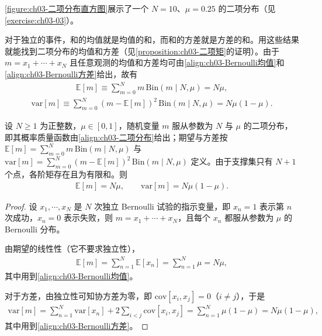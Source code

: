 \documentclass[../../main.tex]{subfiles}
\begin{document}
\cref{figure:ch03-二项分布直方图}展示了一个 $N=10$、$\mu=0.25$ 的二项分布（见\cref{exercise:ch03-03}）。

对于独立的事件，和的均值就是均值的和，而和的方差就是方差的和。用这些结果就能找到二项分布的均值和方差（见\cref{proposition:ch03-二项矩}的证明）。由于 $m=x_1+\cdots+x_N$ 且任意观测的均值和方差均可由\cref{align:ch03-Bernoulli均值}和\cref{align:ch03-Bernoulli方差}给出，故有
\begin{align}
\mathbb{E}[m]\equiv\sum_{m=0}^{N}m\,\mathrm{Bin}(m\mid N,\mu)=N\mu,
\label{align:ch03-二项均值}
\end{align}
\begin{align}
\mathrm{var}[m]\equiv\sum_{m=0}^{N}(m-\mathbb{E}[m])^{2}\,\mathrm{Bin}(m\mid N,\mu)=N\mu(1-\mu).
\label{align:ch03-二项方差}
\end{align}

\begin{proposition}[二项分布的均值与方差]\label{proposition:ch03-二项矩}
设 $N\geqslant1$ 为正整数，$\mu\in[0,1]$，随机变量 $m$ 服从参数为 $N$ 与 $\mu$ 的二项分布，即其概率质量函数由\eqref{align:ch03-二项分布}给出；期望与方差按 $\mathbb{E}[m]=\sum_{m=0}^{N}m\,\mathrm{Bin}(m\mid N,\mu)$ 与 $\mathrm{var}[m]=\sum_{m=0}^{N}(m-\mathbb{E}[m])^{2}\,\mathrm{Bin}(m\mid N,\mu)$ 定义。由于支撑集只有 $N+1$ 个点，各阶矩存在且为有限和。则
\begin{align*}
\mathbb{E}[m]=N\mu,\qquad \mathrm{var}[m]=N\mu(1-\mu).
\end{align*}
\end{proposition}
\begin{proof}
设 $x_1,\cdots,x_N$ 是 $N$ 次独立 Bernoulli 试验的指示变量，即 $x_n=1$ 表示第 $n$ 次成功，$x_n=0$ 表示失败，则 $m=x_1+\cdots+x_N$，且每个 $x_n$ 都服从参数为 $\mu$ 的 Bernoulli 分布。

由期望的线性性（它不要求独立性），
\begin{align*}
\mathbb{E}[m]=\sum_{n=1}^{N}\mathbb{E}[x_n]=\sum_{n=1}^{N}\mu=N\mu,
\end{align*}
其中用到\eqref{align:ch03-Bernoulli均值}。

对于方差，由独立性可知协方差为零，即 $\mathrm{cov}[x_i,x_j]=0$（$i\neq j$），于是
\begin{align*}
\mathrm{var}[m]=\sum_{n=1}^{N}\mathrm{var}[x_n]+2\sum_{i<j}\mathrm{cov}[x_i,x_j]=\sum_{n=1}^{N}\mu(1-\mu)=N\mu(1-\mu),
\end{align*}
其中用到\eqref{align:ch03-Bernoulli方差}。
\end{proof}
\end{document}
